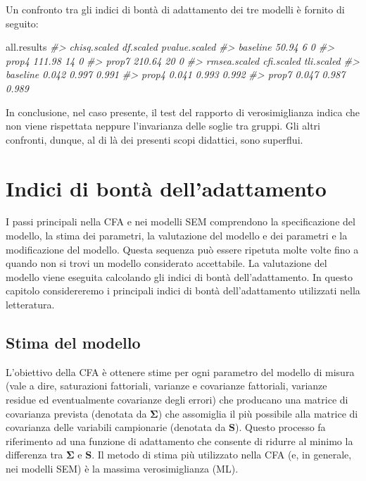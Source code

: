 \documentclass[
  11pt,
]{krantz}
\makeatletter
\newenvironment{Shaded}{\begin{snugshade}}{\end{snugshade}}
\newcommand{\CommentTok}[1]{\textcolor[rgb]{0.37,0.37,0.37}{\textit{#1}}}
\newcommand{\NormalTok}[1]{#1}
\newenvironment{kframe}{%
\medskip{}
\setlength{\fboxsep}{.8em}
 \def\at@end@of@kframe{}%
 \ifinner\ifhmode%
  \def\at@end@of@kframe{\end{minipage}}%
  \begin{minipage}{\columnwidth}%
 \fi\fi%
 \def\FrameCommand##1{\hskip\@totalleftmargin \hskip-\fboxsep
 \colorbox{shadecolor}{##1}\hskip-\fboxsep
     \hskip-\linewidth \hskip-\@totalleftmargin \hskip\columnwidth}%
 \MakeFramed {\advance\hsize-\width
   \@totalleftmargin\z@ \linewidth\hsize
   \@setminipage}}%
 {\par\unskip\endMakeFramed%
 \at@end@of@kframe}
\renewenvironment{Shaded}{\begin{kframe}}{\end{kframe}}
\theoremstyle{definition}
\theoremstyle{definition}
\theoremstyle{definition}
\theoremstyle{definition}
\theoremstyle{remark}
\makeatother
\begin{document}
Un confronto tra gli indici di bontà di adattamento dei tre modelli è fornito di seguito:

\begin{Shaded}
\begin{Highlighting}[]
\NormalTok{all.results}
\CommentTok{\#\textgreater{}          chisq.scaled df.scaled pvalue.scaled}
\CommentTok{\#\textgreater{} baseline        50.94         6             0}
\CommentTok{\#\textgreater{} prop4          111.98        14             0}
\CommentTok{\#\textgreater{} prop7          210.64        20             0}
\CommentTok{\#\textgreater{}          rmsea.scaled cfi.scaled tli.scaled}
\CommentTok{\#\textgreater{} baseline        0.042      0.997      0.991}
\CommentTok{\#\textgreater{} prop4           0.041      0.993      0.992}
\CommentTok{\#\textgreater{} prop7           0.047      0.987      0.989}
\end{Highlighting}
\end{Shaded}

In conclusione, nel caso presente, il test del rapporto di verosimiglianza indica che non viene rispettata neppure l'invarianza delle soglie tra gruppi. Gli altri confronti, dunque, al di là dei presenti scopi didattici, sono superflui.

\hypertarget{ch:gof}{%
\chapter{Indici di bontà dell'adattamento}\label{ch:gof}}

I passi principali nella CFA e nei modelli SEM comprendono la specificazione del modello, la stima dei parametri, la valutazione del modello e dei parametri e la modificazione del modello. Questa sequenza può essere ripetuta molte volte fino a quando non si trovi un modello considerato accettabile. La valutazione del modello viene eseguita calcolando gli indici di bontà dell'adattamento. In questo capitolo considereremo i principali indici di bontà dell'adattamento utilizzati nella letteratura.

\hypertarget{stima-del-modello}{%
\section{Stima del modello}\label{stima-del-modello}}

L'obiettivo della CFA è ottenere stime per ogni parametro del modello di misura (vale a dire, saturazioni fattoriali, varianze e covarianze fattoriali, varianze residue ed eventualmente covarianze degli errori) che producano una matrice di covarianza prevista (denotata da \(\boldsymbol{\Sigma}\)) che assomiglia il più possibile alla matrice di covarianza delle variabili campionarie (denotata da \(\boldsymbol{S}\)). Questo processo fa riferimento ad una funzione di adattamento che consente di ridurre al minimo la differenza tra \(\boldsymbol{\Sigma}\) e \(\boldsymbol{S}\). Il metodo di stima più utilizzato nella CFA (e, in generale, nei modelli SEM) è la massima verosimiglianza (ML).
\end{document}
